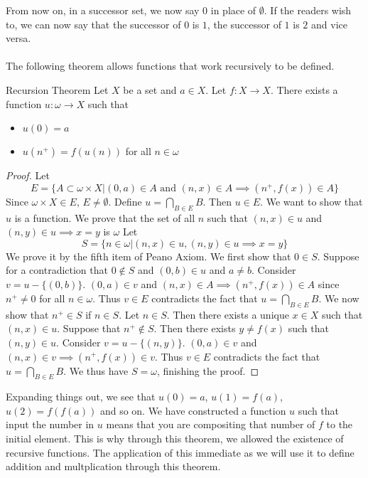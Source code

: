 From now on, in a successor set, we now say $0$ in place of $\emptyset$. If the readers wish to, we can now say that the successor of $0$ is $1$, the successor of $1$ is $2$ and vice versa. \\~\\
The following theorem allows functions that work recursively to be defined. 

\begin{thm}{Recursion Theorem}{} Let $X$ be a set and $a\in X$. Let $f:X\to X$. There exists a function $u:\omega\to X$ such that
\begin{itemize}
\item $u(0)=a$
\item $u(n^+)=f(u(n))$ for all $n\in\omega$
\end{itemize}\tcbline
\begin{proof} Let $$E=\{A\subset\omega\times X|(0,a)\in A\text{ and }(n,x)\in A\implies (n^+,f(x))\in A\}$$ Since $\omega\times X\in E$, $E\neq\emptyset$. Define $u=\bigcap_{B\in E}B$. Then $u\in E$. We want to show that $u$ is a function. We prove that the set of all $n$ such that $(n,x)\in u$ and $(n,y)\in u\implies x=y$ is $\omega$ Let $$S=\{n\in\omega|(n,x)\in u,(n,y)\in u\implies x=y\}$$ We prove it by the fifth item of Peano Axiom. \linebreak\linebreak
We first show that $0\in S$. Suppose for a contradiction that $0\notin S$ and $(0,b)\in u$ and $a\neq b$. Consider $v=u-\{(0,b)\}$. $(0,a)\in v$ and $(n,x)\in A\implies (n^+,f(x))\in A$ since $n^+\neq 0$ for all $n\in\omega$. Thus $v\in E$ contradicts the fact that $u=\bigcap_{B\in E}B$. \linebreak\linebreak
We now show that $n^+\in S$ if $n\in S$. Let $n\in S$. Then there exists a unique $x\in X$ such that $(n,x)\in u$. Suppose that $n^+\notin S$. Then there exists $y\neq f(x)$ such that $(n,y)\in u$. Consider $v=u-\{(n,y)\}$. $(0,a)\in v$ and $(n,x)\in v\implies (n^+,f(x))\in v$. Thus $v\in E$ contradicts the fact that $u=\bigcap_{B\in E}B$. We thus have $S=\omega$, finishing the proof. 
\end{proof}
\end{thm}

Expanding things out, we see that $u(0)=a$, $u(1)=f(a)$, $u(2)=f(f(a))$ and so on. We have constructed a function $u$ such that input the number in $u$ means that you are compositing that number of $f$ to the initial element. This is why through this theorem, we allowed the existence of recursive functions. The application of this immediate as we will use it to define addition and multplication through this theorem. 


